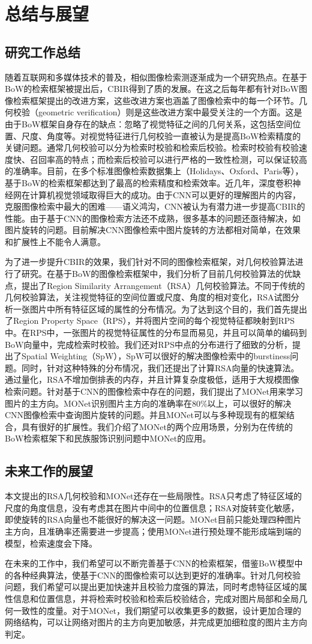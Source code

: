 \chapter{总结与展望}
\section{研究工作总结}
随着互联网和多媒体技术的普及，相似图像检索测逐渐成为一个研究热点。在基于BoW的检索框架\cite{sivic2003video}被提出后，CBIR得到了质的发展。在这之后每年都有针对BoW图像检索框架提出的改进方案，这些改进方案也涵盖了图像检索中的每一个环节。几何校验（geometric verification）则是这些改进方案中最受关注的一个方面。这是由于BoW框架自身存在的缺点：忽略了视觉特征之间的几何关系，这包括空间位置、尺度、角度等。对视觉特征进行几何校验一直被认为是提高BoW检索精度的关键问题。通常几何校验可以分为检索时校验和检索后校验。检索时校验有校验速度快、召回率高的特点；而检索后校验可以进行严格的一致性检测，可以保证较高的准确率。目前，在多个标准图像检索数据集上（Holidays、Oxford、Paris等），基于BoW的检索框架都达到了最高的检索精度和检索效率。近几年，深度卷积神经网在计算机视觉领域取得巨大的成功。由于CNN可以更好的理解图片的内容，克服图像检索中最大的困难——语义鸿沟，CNN被认为有潜力进一步提高CBIR的性能。由于基于CNN的图像检索方法还不成熟，很多基本的问题还亟待解决，如图片旋转的问题。目前解决CNN图像检索中图片旋转的方法都相对简单，在效果和扩展性上不能令人满意。

为了进一步提升CBIR的效果，我们针对不同的图像检索框架，对几何校验算法进行了研究。在基于BoW的图像检索框架中，我们分析了目前几何校验算法的优缺点，提出了Region Similarity Arrangement（RSA）几何校验算法。不同于传统的几何校验算法，关注视觉特征的空间位置或尺度、角度的相对变化，RSA试图分析一张图片中所有特征区域的属性的分布情况。为了达到这个目的，我们首先提出了Region Property Space（RPS），并将图片空间的每个视觉特征都映射到RPS中。在RPS中，一张图片的视觉特征属性的分布显而易见，并且可以简单的编码到BoW向量中，完成检索时校验。我们还对RPS中点的分布进行了细致的分析，提出了Spatial Weighting（SpW），SpW可以很好的解决图像检索中的burstiness问题。同时，针对这种特殊的分布情况，我们还提出了计算RSA向量的快速算法。通过量化，RSA不增加倒排表的内存，并且计算复杂度极低，适用于大规模图像检索问题。针对基于CNN的图像检索中存在的问题，我们提出了MONet用来学习图片的主方向。MONet识别图片主方向的准确率在80\%以上，可以很好的解决CNN图像检索中查询图片旋转的问题。并且MONet可以与多种现现有的框架结合，具有很好的扩展性。我们介绍了MONet的两个应用场景，分别为在传统的BoW检索框架下和民族服饰识别问题中MONet的应用。

\section{未来工作的展望}
本文提出的RSA几何校验和MONet还存在一些局限性。RSA只考虑了特征区域的尺度的角度信息，没有考虑其在图片中间中的位置信息；RSA对旋转变化敏感，即使旋转的RSA向量也不能很好的解决这一问题。MONet目前只能处理四种图片主方向，且准确率还需要进一步提高；使用MONet进行预处理不能形成端到端的模型，检索速度会下降。

在未来的工作中，我们希望可以不断完善基于CNN的检索框架，借鉴BoW模型中的各种经典算法，使基于CNN的图像检索可以达到更好的准确率。针对几何校验问题，我们希望可以提出更加快速并且校验力度强的算法，同时考虑特征区域的属性信息和位置信息，并将检索时校验和检索后校验结合，完成对图片局部和全局几何一致性的度量。对于MONet，我们期望可以收集更多的数据，设计更加合理的网络结构，可以让网络对图片的主方向更加敏感，并完成更加细粒度的图片主方向判定。


